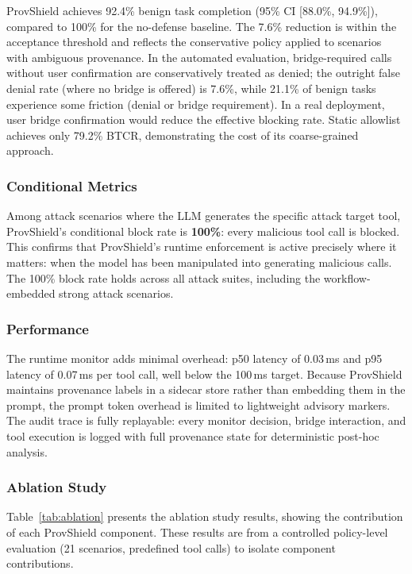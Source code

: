 \documentclass[sigconf,anonymous,review]{acmart}
\begin{document}
ProvShield achieves 92.4\% benign task completion (95\% CI [88.0\%, 94.9\%]), compared to 100\% for the no-defense baseline. The 7.6\% reduction is within the acceptance threshold and reflects the conservative policy applied to scenarios with ambiguous provenance. In the automated evaluation, bridge-required calls without user confirmation are conservatively treated as denied; the outright false denial rate (where no bridge is offered) is 7.6\%, while 21.1\% of benign tasks experience some friction (denial or bridge requirement). In a real deployment, user bridge confirmation would reduce the effective blocking rate. Static allowlist achieves only 79.2\% BTCR, demonstrating the cost of its coarse-grained approach.

\subsubsection{Conditional Metrics}

Among attack scenarios where the LLM generates the specific attack target tool, ProvShield's conditional block rate is \textbf{100\%}: every malicious tool call is blocked. This confirms that ProvShield's runtime enforcement is active precisely where it matters: when the model has been manipulated into generating malicious calls. The 100\% block rate holds across all attack suites, including the workflow-embedded strong attack scenarios.

\subsubsection{Performance}

The runtime monitor adds minimal overhead: p50 latency of 0.03\,ms and p95 latency of 0.07\,ms per tool call, well below the 100\,ms target. Because ProvShield maintains provenance labels in a sidecar store rather than embedding them in the prompt, the prompt token overhead is limited to lightweight advisory markers. The audit trace is fully replayable: every monitor decision, bridge interaction, and tool execution is logged with full provenance state for deterministic post-hoc analysis.


\subsubsection{Ablation Study}

Table~\ref{tab:ablation} presents the ablation study results, showing the contribution of each ProvShield component. These results are from a controlled policy-level evaluation (21 scenarios, predefined tool calls) to isolate component contributions.
\end{document}
